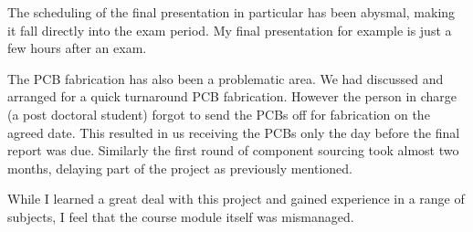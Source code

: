 The scheduling of the final presentation in particular has been abysmal, making
it fall directly into the exam period. My final presentation for example is just
a few hours after an exam.

The PCB fabrication has also been a problematic area. We had discussed and arranged
for a quick turnaround PCB fabrication. However the person in charge (a post doctoral
student) forgot to send the PCBs off for fabrication on the agreed date. This resulted
in us receiving the PCBs only the day before the final report was due. Similarly
the first round of component sourcing took almost two months, delaying part of
the project as previously mentioned.

While I learned a great deal with this project and gained experience in a range
of subjects, I feel that the course module itself was mismanaged.







% 
